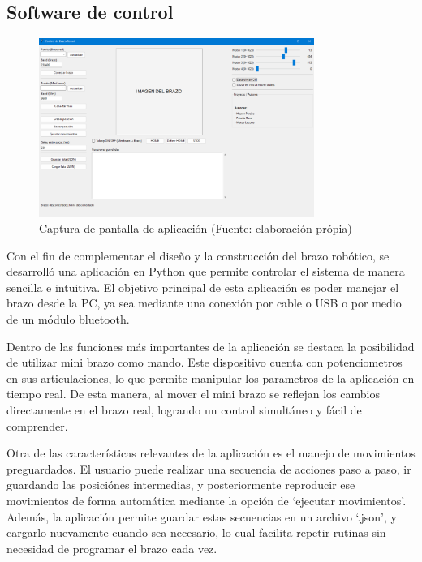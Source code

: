 \subsection{Software de control}

\begin{figure}[H]
  \centering
  \includegraphics[width=0.8\textwidth]{anexos/software/ventanaApp.png}
  \caption{Captura de pantalla de aplicación (Fuente: elaboración própia)}\label{fig:captura.ventanaApp}
\end{figure}

Con el fin de complementar el diseño y la construcción del brazo robótico, se desarrolló una aplicación en Python que permite controlar el sistema de manera sencilla e intuitiva. El objetivo principal de esta aplicación es poder manejar el brazo desde la PC, ya sea mediante una conexión por cable o USB o por medio de un módulo bluetooth.

Dentro de las funciones más importantes de la aplicación se destaca la posibilidad de utilizar mini brazo como mando. Este dispositivo cuenta con potenciometros en sus articulaciones, lo que permite manipular los parametros de la aplicación en tiempo real. De esta manera, al mover el mini brazo se reflejan los cambios directamente en el brazo real, logrando un control simultáneo y fácil de comprender.

Otra de las características relevantes de la aplicación es el manejo de movimientos preguardados. El usuario puede realizar una secuencia de acciones paso a paso, ir guardando las posiciónes intermedias, y posteriormente reproducir ese movimientos de forma automática mediante la opción de `ejecutar movimientos'. Además, la aplicación permite guardar estas secuencias en un archivo `.json', y cargarlo nuevamente cuando sea necesario, lo cual facilita repetir rutinas sin necesidad de programar el brazo cada vez.

